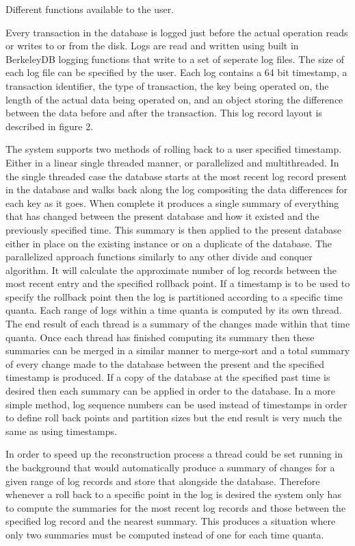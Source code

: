 \documentclass{article}
\begin{document}
Different functions available to the user.

Every transaction in the database is logged just before the actual operation reads or writes to or from the disk. Logs are read and written using built in BerkeleyDB logging functions that write to a set of seperate log files. The size of each log file can be specified by the user. Each log contains a 64 bit timestamp, a transaction identifier, the type of transaction, the key being operated on, the length of the actual data being operated on, and an object storing the difference between the data before and after the transaction. This log record layout is described in figure 2.

The system supports two methods of rolling back to a user specified timestamp. Either in a linear single threaded manner, or parallelized and multithreaded. In the single threaded case the database starts at the most recent log record present in the database and walks back along the log compositing the data differences for each key as it goes. When complete it produces a single summary of everything that has changed between the present database and how it existed and the previously specified time. This summary is then applied to the present database either in place on the existing instance or on a duplicate of the database. The parallelized approach functions similarly to any other divide and conquer algorithm. It will calculate the approximate number of log records between the most recent entry and the specified rollback point. If a timestamp is to be used to specify the rollback point then the log is partitioned according to a specific time quanta. Each range of logs within a time quanta is computed by its own thread. The end result of each thread is a summary of the changes made within that time quanta. Once each thread has finished computing its summary then these summaries can be merged in a similar manner to merge-sort and a total summary of every change made to the database between the present and the specified timestamp is produced. If a copy of the database at the specified past time is desired then each summary can be applied in order to the database. In a more simple method, log sequence numbers can be used instead of timestamps in order to define roll back points and partition sizes  but the end result is very much the same as using timestamps.

In order to speed up the reconstruction process a thread could be set running in the background that would automatically produce a summary of changes for a given range of log records and store that alongside the database. Therefore whenever a roll back to a specific point in the log is desired the system only has to compute the summaries for the most recent log records and those between the specified log record and the nearest summary. This produces a situation where only two summaries must be computed instead of one for each time quanta.
\end{document}
